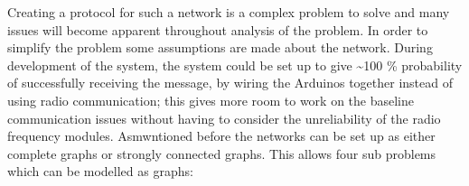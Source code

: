 \noindent Creating a protocol for such a network is a complex problem to solve and many issues will become apparent throughout analysis of the problem.
In order to simplify the problem some assumptions are made about the network.
During development of the system, the system could be set up to give \textasciitilde100 \% probability of successfully receiving the message, by wiring the Arduinos together instead of using radio communication; this gives more room to work on the baseline communication issues without having to consider the unreliability of the radio frequency modules.
Asmwntioned before the networks can be set up as either complete graphs or strongly connected graphs.
This allows four sub problems which can be modelled as graphs:
\\
